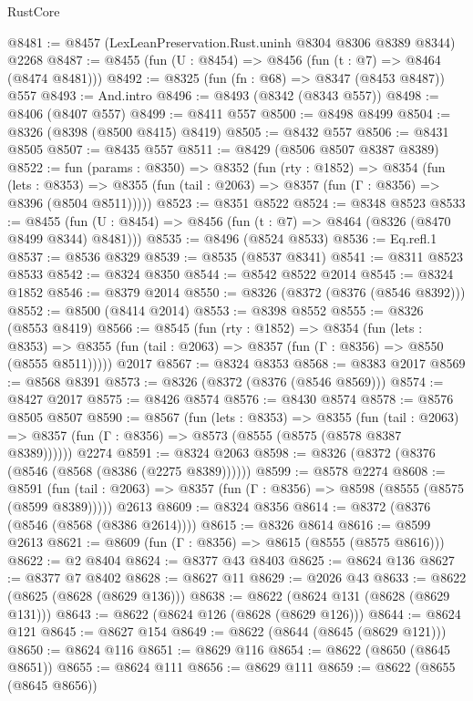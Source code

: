 \begin{lexlean}{RustCore}
\begin{coremodule}
@8481 := @8457 (LexLeanPreservation.Rust.uninh @8304 @8306 @8389 @8344) @2268
@8487 := @8455 (fun (U : @8454) => @8456 (fun (t : @7) => @8464 (@8474 @8481)))
@8492 := @8325 (fun (fn : @68) => @8347 (@8453 @8487)) @557
@8493 := And.intro
@8496 := @8493 (@8342 (@8343 @557))
@8498 := @8406 (@8407 @557)
@8499 := @8411 @557
@8500 := @8498 @8499
@8504 := @8326 (@8398 (@8500 @8415) @8419)
@8505 := @8432 @557
@8506 := @8431 @8505
@8507 := @8435 @557
@8511 := @8429 (@8506 @8507 @8387 @8389)
@8522 := fun (params : @8350) =>
  @8352
    (fun (rty : @1852) =>
    @8354
      (fun (lets : @8353) =>
      @8355 (fun (tail : @2063) => @8357 (fun (Γ : @8356) => @8396 (@8504 @8511)))))
@8523 := @8351 @8522
@8524 := @8348 @8523
@8533 := @8455 (fun (U : @8454) => @8456 (fun (t : @7) => @8464 (@8326 (@8470 @8499 @8344) @8481)))
@8535 := @8496 (@8524 @8533)
@8536 := Eq.refl.{1}
@8537 := @8536 @8329
@8539 := @8535 (@8537 @8341)
@8541 := @8311 @8523 @8533
@8542 := @8324 @8350
@8544 := @8542 @8522 @2014
@8545 := @8324 @1852
@8546 := @8379 @2014
@8550 := @8326 (@8372 (@8376 (@8546 @8392)))
@8552 := @8500 (@8414 @2014)
@8553 := @8398 @8552
@8555 := @8326 (@8553 @8419)
@8566 := @8545
    (fun (rty : @1852) =>
    @8354
      (fun (lets : @8353) =>
      @8355 (fun (tail : @2063) => @8357 (fun (Γ : @8356) => @8550 (@8555 @8511)))))
    @2017
@8567 := @8324 @8353
@8568 := @8383 @2017
@8569 := @8568 @8391
@8573 := @8326 (@8372 (@8376 (@8546 @8569)))
@8574 := @8427 @2017
@8575 := @8426 @8574
@8576 := @8430 @8574
@8578 := @8576 @8505 @8507
@8590 := @8567
    (fun (lets : @8353) =>
    @8355
      (fun (tail : @2063) => @8357 (fun (Γ : @8356) => @8573 (@8555 (@8575 (@8578 @8387 @8389))))))
    @2274
@8591 := @8324 @2063
@8598 := @8326 (@8372 (@8376 (@8546 (@8568 (@8386 (@2275 @8389))))))
@8599 := @8578 @2274
@8608 := @8591
    (fun (tail : @2063) => @8357 (fun (Γ : @8356) => @8598 (@8555 (@8575 (@8599 @8389)))))
    @2613
@8609 := @8324 @8356
@8614 := @8372 (@8376 (@8546 (@8568 (@8386 @2614))))
@8615 := @8326 @8614
@8616 := @8599 @2613
@8621 := @8609 (fun (Γ : @8356) => @8615 (@8555 (@8575 @8616)))
@8622 := @2 @8404
@8624 := @8377 @43 @8403
@8625 := @8624 @136
@8627 := @8377 @7 @8402
@8628 := @8627 @11
@8629 := @2026 @43
@8633 := @8622 (@8625 (@8628 (@8629 @136)))
@8638 := @8622 (@8624 @131 (@8628 (@8629 @131)))
@8643 := @8622 (@8624 @126 (@8628 (@8629 @126)))
@8644 := @8624 @121
@8645 := @8627 @154
@8649 := @8622 (@8644 (@8645 (@8629 @121)))
@8650 := @8624 @116
@8651 := @8629 @116
@8654 := @8622 (@8650 (@8645 @8651))
@8655 := @8624 @111
@8656 := @8629 @111
@8659 := @8622 (@8655 (@8645 @8656))

\end{coremodule}
\end{lexlean}
